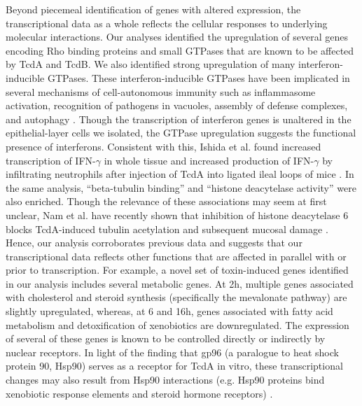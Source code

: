 Beyond piecemeal identification of genes with altered expression, 
the transcriptional data as a whole reflects the cellular responses 
to underlying molecular interactions. Our analyses identified the 
upregulation of several genes encoding Rho binding proteins and 
small GTPases that are known to be affected by TcdA and TcdB. We 
also identified strong upregulation of many interferon-inducible 
GTPases. These interferon-inducible GTPases have been implicated in 
several mechanisms of cell-autonomous immunity such as inflammasome 
activation, recognition of pathogens in vacuoles, assembly of 
defense complexes, and autophagy \cite{Kim:2012cu}. Though the 
transcription of interferon genes is unaltered in the 
epithelial-layer cells we isolated, the GTPase upregulation 
suggests the functional presence of interferons. Consistent 
with this, Ishida et al. found increased transcription of 
IFN-$\gamma$ in whole tissue and increased production of 
IFN-$\gamma$ by infiltrating neutrophils after injection of 
TcdA into ligated ileal loops of mice \cite{Ishida:2004ta}. 
In the same analysis, ``beta-tubulin binding'' and ``histone 
deacytelase activity'' were also enriched. Though the relevance 
of these associations may seem at first unclear, Nam et al. 
have recently shown that inhibition of histone deacytelase 6 
blocks TcdA-induced tubulin acetylation and subsequent 
mucosal damage \cite{Nam:2010er}. Hence, our analysis 
corroborates previous data and suggests that our transcriptional 
data reflects other functions that are affected in parallel 
with or prior to transcription. For example, a novel set of 
toxin-induced genes identified in our analysis includes 
several metabolic genes. At 2h, multiple genes associated 
with cholesterol and steroid synthesis (specifically the 
mevalonate pathway) are slightly upregulated, whereas, at 
6 and 16h, genes associated with fatty acid metabolism and 
detoxification of xenobiotics are downregulated. The 
expression of several of these genes is known to be controlled 
directly or indirectly by nuclear receptors. In light of the 
finding that gp96 (a paralogue to heat shock protein 90, Hsp90) 
serves as a receptor for TcdA in vitro, these transcriptional 
changes may also result from Hsp90 interactions (e.g. Hsp90 proteins 
bind xenobiotic response elements and steroid hormone 
receptors) \cite{Na:2008eu}.

